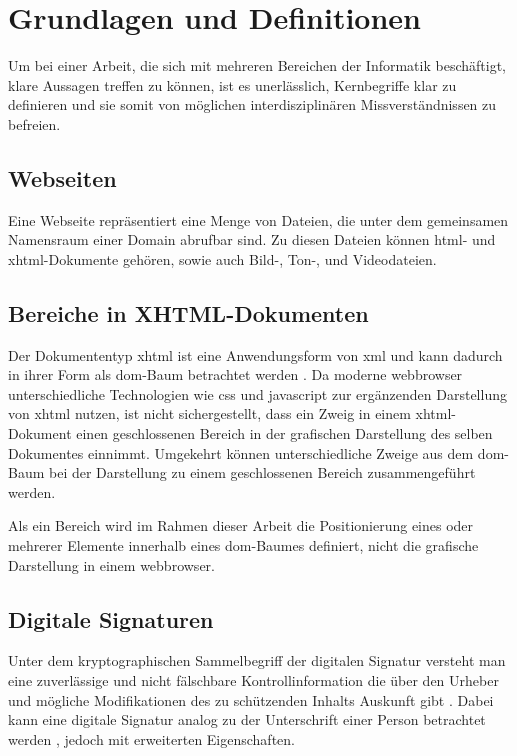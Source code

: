 
\chapter{Grundlagen und Definitionen}
\label{chap:GrundlagenDefinitionen}

Um bei einer Arbeit, die sich mit mehreren Bereichen der Informatik beschäftigt, klare Aussagen treffen zu können, ist es unerlässlich, Kernbegriffe klar zu
definieren und sie somit von möglichen interdisziplinären Missverständnissen zu befreien.

\section{Webseiten}
\label{sec:GrundlagenDefinitionen:Webseiten}
Eine Webseite repräsentiert eine Menge von Dateien, die unter dem gemeinsamen Namensraum einer Domain abrufbar sind. Zu diesen Dateien können \gls{html}- und
\gls{xhtml}-Dokumente gehören, sowie auch Bild-, Ton-, und Videodateien.

\section{Bereiche in XHTML-Dokumenten}
\label{sec:GrundlagenDefinitionen:BereicheXHTML}
Der Dokumententyp \gls{xhtml} ist eine Anwendungsform von \gls{xml} \cite{xhtml:w3c} und kann dadurch in ihrer Form als \gls{dom}-Baum betrachtet
werden \cite{xhtml:oreilly}. Da moderne \Gls{webbrowser} unterschiedliche Technologien wie \gls{css} und \gls{javascript} zur ergänzenden Darstellung von
\gls{xhtml} nutzen, ist nicht sichergestellt, dass ein Zweig in einem \gls{xhtml}-Dokument einen geschlossenen Bereich in der grafischen Darstellung des
selben Dokumentes einnimmt. Umgekehrt können unterschiedliche Zweige aus dem \gls{dom}-Baum bei der Darstellung zu einem geschlossenen Bereich zusammengeführt
werden.

Als ein Bereich wird im Rahmen dieser Arbeit die Positionierung eines oder mehrerer Elemente innerhalb eines \gls{dom}-Baumes definiert, nicht die grafische
Darstellung in einem \gls{webbrowser}.

\section{Digitale Signaturen}
\label{sec:GrundlagenDefinitionen:DigitaleSignaturen}
Unter dem kryptographischen Sammelbegriff der digitalen Signatur versteht man eine zuverlässige und nicht fälschbare Kontrollinformation die über den Urheber
und mögliche Modifikationen des zu schützenden Inhalts Auskunft gibt \cite{kits}. Dabei kann eine digitale Signatur analog zu der Unterschrift einer Person
betrachtet werden \cite{esig:bsi}, jedoch mit erweiterten Eigenschaften.

